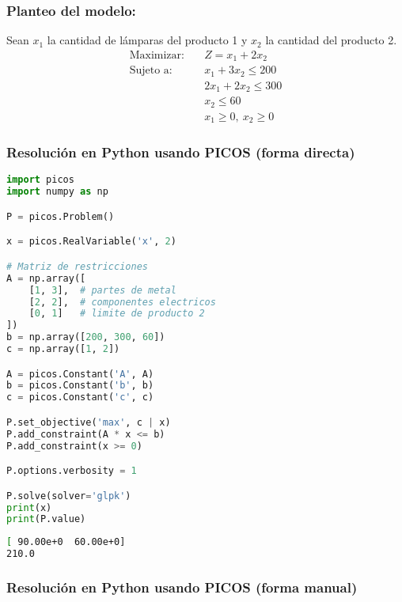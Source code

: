 \documentclass[12pt]{article}
\begin{document}
\subsubsection{Planteo del modelo:}

Sean $x_1$ la cantidad de lámparas del producto 1 y $x_2$ la cantidad del producto 2.
\begin{align*}
\text{Maximizar:} \quad & Z = x_1 + 2x_2 \\
\text{Sujeto a:} \quad & x_1 + 3x_2 \leq 200 \\
                       & 2x_1 + 2x_2 \leq 300 \\
                       & x_2 \leq 60 \\
                       & x_1 \geq 0,\ x_2 \geq 0
\end{align*}

\subsubsection{Resolución en Python usando PICOS (forma directa)}

\begin{lstlisting}[language=Python]
import picos
import numpy as np

P = picos.Problem()

x = picos.RealVariable('x', 2)

# Matriz de restricciones
A = np.array([
    [1, 3],  # partes de metal
    [2, 2],  # componentes electricos
    [0, 1]   # limite de producto 2
])
b = np.array([200, 300, 60])
c = np.array([1, 2])

A = picos.Constant('A', A)
b = picos.Constant('b', b)
c = picos.Constant('c', c)

P.set_objective('max', c | x)
P.add_constraint(A * x <= b)
P.add_constraint(x >= 0)

P.options.verbosity = 1

P.solve(solver='glpk')
print(x)
print(P.value)
\end{lstlisting}

\begin{lstlisting}[language=bash,backgroundcolor=\color{black},basicstyle=\color{white}\ttfamily,numbers=none]
[ 90.00e+0  60.00e+0]
210.0
\end{lstlisting}

\subsubsection{Resolución en Python usando PICOS (forma manual)}
\end{document}
